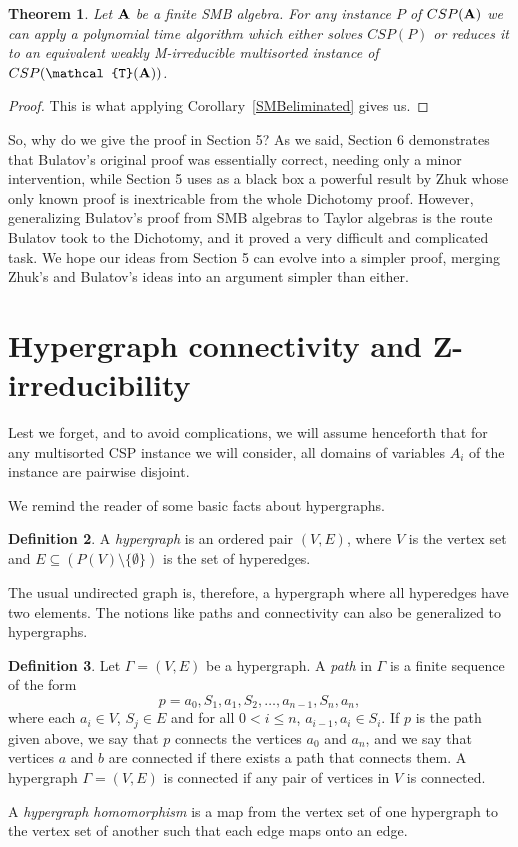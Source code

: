 \documentclass[11pt]{amsart}
\newcommand{\m}[1]{{\uppercase {\mathbf {#1}}}}
\newcommand{\vr}[1]{{\uppercase {\mathcal{#1}}}}
\newtheorem{thm}{Theorem}[section]
\theoremstyle{definition}
\newtheorem{df}[thm]{Definition}
\begin{document}
\begin{thm}\label{M-irrweaker}
Let $\m a$ be a finite SMB algebra. For any instance $P$ of $CSP(\m a)$ we can apply a polynomial time algorithm which either solves $CSP(P)$ or reduces it to an equivalent weakly M-irreducible multisorted instance of $CSP(\vr t(\m a))$.
\end{thm}

\begin{proof}
This is what applying Corollary~\ref{SMBeliminated} gives us.
\end{proof}

So, why do we give the proof in Section 5? As we said, Section 6 demonstrates that Bulatov's original proof was essentially correct, needing only a minor intervention, while Section 5 uses as a black box a powerful result by Zhuk whose only known proof is inextricable from the whole Dichotomy proof. However, generalizing Bulatov's proof from SMB algebras to Taylor algebras is the route Bulatov took to the Dichotomy, and it proved a very difficult and complicated task. We hope our ideas from Section 5 can evolve into a simpler proof, merging Zhuk's and Bulatov's ideas into an argument simpler than either.

\section{Hypergraph connectivity and Z-irreducibility}

Lest we forget, and to avoid complications, we will assume henceforth that for any multisorted CSP instance we will consider, all domains of variables $A_i$ of the instance are pairwise disjoint. 

We remind the reader of some basic facts about hypergraphs. 

\begin{df}\label{hyperdef}
A {\em hypergraph} is an ordered pair $(V,E)$, where $V$ is the vertex set and $E\subseteq (P(V)\setminus\{\emptyset\})$ is the set of hyperedges.
\end{df}

The usual undirected graph is, therefore, a hypergraph where all hyperedges have two elements. The notions like paths and connectivity can also be generalized to hypergraphs.

\begin{df}\label{hyperpath}
Let $\Gamma=(V,E)$ be a hypergraph. A {\em path} in $\Gamma$ is a finite sequence of the form $$p=a_0, S_1, a_1,S_2,\dots,a_{n-1},S_n,a_n,$$ where each $a_i\in V$, $S_j\in E$ and for all $0<i\leq n$, $a_{i-1}, a_i\in S_i$. If $p$ is the path given above, we say that $p$ connects the vertices $a_0$ and $a_n$, and we say that vertices $a$ and $b$ are connected if there exists a path that connects them. A hypergraph $\Gamma=(V,E)$ is connected if any pair of vertices in $V$ is connected.

A {\em hypergraph homomorphism} is a map from the vertex set of one hypergraph to the vertex set of another such that each edge maps onto an edge.
\end{df}
\end{document}
